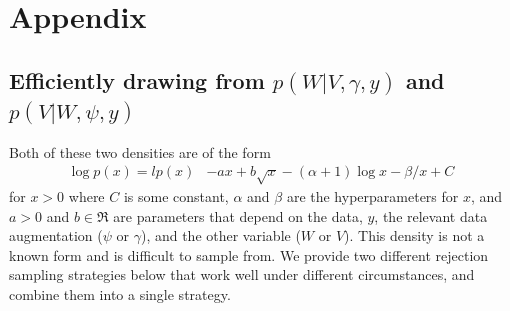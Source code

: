 \documentclass{article}
\begin{document}
\section{Appendix}\label{sec:append}

\subsection{Efficiently drawing from $p(W|V,\gamma,y)$ and $p(V|W,\psi,y)$}
Both of these two densities are of the form
\begin{align*}
\log p(x) = lp(x) & -ax + b\sqrt{x} - (\alpha + 1)\log x -\beta/x + C 
\end{align*}
for $x>0$ where $C$ is some constant, $\alpha$ and $\beta$ are the hyperparameters for $x$, and $a>0$ and $b\in \Re$ are parameters that depend on the data, $y$, the relevant data augmentation ($\psi$ or $\gamma$), and the other variable ($W$ or $V$). This density is not a known form and is difficult to sample from. We provide two different rejection sampling strategies below that work well under different circumstances, and combine them into a single strategy.
\end{document}
